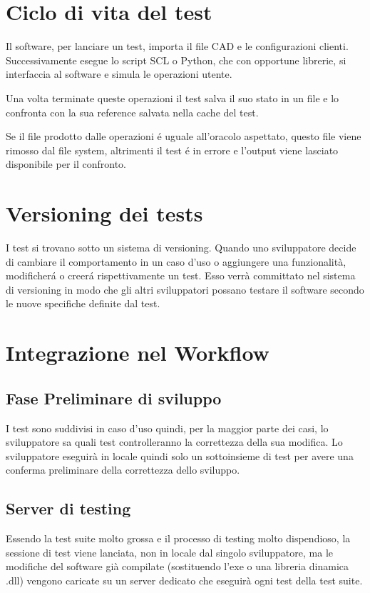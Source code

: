     \section{Ciclo di vita del test}
        Il software, per lanciare un test, importa il file CAD e le configurazioni clienti.
        Successivamente esegue lo script SCL o Python, che con opportune librerie, si interfaccia al software
        e simula le operazioni utente. 
        
        Una volta terminate queste operazioni il test salva il suo stato in un file e lo confronta con la sua reference 
        salvata nella cache del test. 

        Se il file prodotto dalle operazioni \'e uguale all'oracolo aspettato, questo file viene rimosso dal file system, altrimenti il test \'e in errore e l'output viene lasciato disponibile per il confronto.

    \section{Versioning dei tests}
            I test si trovano sotto un sistema di versioning.
            Quando uno sviluppatore decide di cambiare il comportamento in un caso d'uso o aggiungere una funzionalità,
            modificher\'a o creer\'a rispettivamente un test.
            Esso verrà committato nel sistema di versioning in modo che gli altri sviluppatori possano testare il software secondo le nuove specifiche definite dal test.    
            
    \section{Integrazione nel Workflow}
        \subsection{Fase Preliminare di sviluppo}
            I test sono suddivisi in caso d'uso quindi, per la maggior parte dei casi, lo sviluppatore sa quali test controlleranno la correttezza della sua modifica.
            Lo sviluppatore eseguirà in locale quindi solo un sottoinsieme di test per avere una conferma preliminare della correttezza dello sviluppo. 
        \subsection{Server di testing}
            Essendo la test suite molto grossa e il processo di testing molto dispendioso, 
            la sessione di test viene lanciata, non in locale dal singolo sviluppatore, 
            ma le modifiche del software già compilate (sostituendo l’exe o una libreria dinamica .dll) 
            vengono caricate su un server dedicato che eseguirà ogni test della test suite.
            
